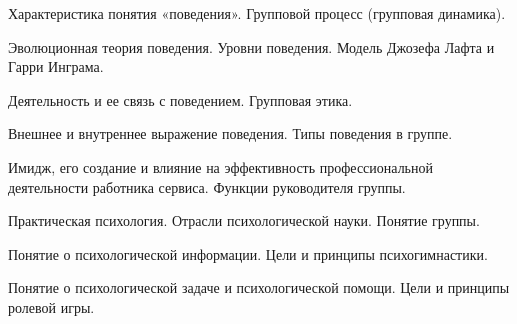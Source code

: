 \documentclass[
	14pt,
	a4paper,
	]
	{scrartcl}
\begin{document}
\shapk
{}
\setcounter{zad}{0}

\vfill
\z Характеристика понятия «поведения».
 \vfill
\z Групповой процесс (групповая динамика). \vfill

\vfill

\newpage


\shapk
{}
\setcounter{zad}{0}

\vfill
\z Эволюционная теория поведения. Уровни поведения.
 \vfill
\z Модель Джозефа Лафта и Гарри Инграма.
 \vfill

\vfill

\newpage


\shapk
{}
\setcounter{zad}{0}

\vfill
\z Деятельность и ее связь с поведением.
 \vfill
\z Групповая этика.
 \vfill

\vfill

\newpage


\shapk
{}
\setcounter{zad}{0}

\vfill
\z Внешнее и внутреннее выражение поведения.
 \vfill
\z Типы поведения в группе.
 \vfill

\vfill

\newpage


\shapk
{}
\setcounter{zad}{0}

\vfill
\z Имидж, его создание и влияние на эффективность профессиональной деятельности работника сервиса.
 \vfill
\z Функции руководителя группы.
 \vfill

\vfill

\newpage


\shapk
{}
\setcounter{zad}{0}

\vfill
\z Практическая психология. Отрасли психологической науки.
 \vfill
\z Понятие группы.
 \vfill

\vfill

\newpage


\shapk
{}
\setcounter{zad}{0}

\vfill
\z Понятие о психологической информации.
 \vfill
\z Цели и принципы психогимнастики.
 \vfill

\vfill

\newpage


\shapk
{}
\setcounter{zad}{0}

\vfill
\z Понятие о психологической задаче и психологической помощи.
 \vfill
\z Цели и принципы ролевой игры.
 \vfill
\end{document}
